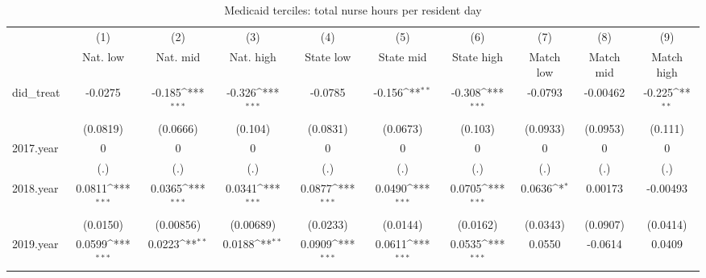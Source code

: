 \begin{table}[htbp]\centering
\def\sym#1{\ifmmode^{#1}\else\(^{#1}\)\fi}
\caption{Medicaid terciles: total nurse hours per resident day}
\begin{tabular}{l*{9}{c}}
\hline\hline
                    &\multicolumn{1}{c}{(1)}&\multicolumn{1}{c}{(2)}&\multicolumn{1}{c}{(3)}&\multicolumn{1}{c}{(4)}&\multicolumn{1}{c}{(5)}&\multicolumn{1}{c}{(6)}&\multicolumn{1}{c}{(7)}&\multicolumn{1}{c}{(8)}&\multicolumn{1}{c}{(9)}\\
                    &\multicolumn{1}{c}{Nat. low}&\multicolumn{1}{c}{Nat. mid}&\multicolumn{1}{c}{Nat. high}&\multicolumn{1}{c}{State low}&\multicolumn{1}{c}{State mid}&\multicolumn{1}{c}{State high}&\multicolumn{1}{c}{Match low}&\multicolumn{1}{c}{Match mid}&\multicolumn{1}{c}{Match high}\\
\hline
did\_treat           &     -0.0275         &      -0.185\sym{***}&      -0.326\sym{***}&     -0.0785         &      -0.156\sym{**} &      -0.308\sym{***}&     -0.0793         &    -0.00462         &      -0.225\sym{**} \\
                    &    (0.0819)         &    (0.0666)         &     (0.104)         &    (0.0831)         &    (0.0673)         &     (0.103)         &    (0.0933)         &    (0.0953)         &     (0.111)         \\
[1em]
2017.year           &           0         &           0         &           0         &           0         &           0         &           0         &           0         &           0         &           0         \\
                    &         (.)         &         (.)         &         (.)         &         (.)         &         (.)         &         (.)         &         (.)         &         (.)         &         (.)         \\
[1em]
2018.year           &      0.0811\sym{***}&      0.0365\sym{***}&      0.0341\sym{***}&      0.0877\sym{***}&      0.0490\sym{***}&      0.0705\sym{***}&      0.0636\sym{*}  &     0.00173         &    -0.00493         \\
                    &    (0.0150)         &   (0.00856)         &   (0.00689)         &    (0.0233)         &    (0.0144)         &    (0.0162)         &    (0.0343)         &    (0.0907)         &    (0.0414)         \\
[1em]
2019.year           &      0.0599\sym{***}&      0.0223\sym{**} &      0.0188\sym{**} &      0.0909\sym{***}&      0.0611\sym{***}&      0.0535\sym{***}&      0.0550         &     -0.0614         &      0.0409         \\

\end{tabular}
\end{table}
